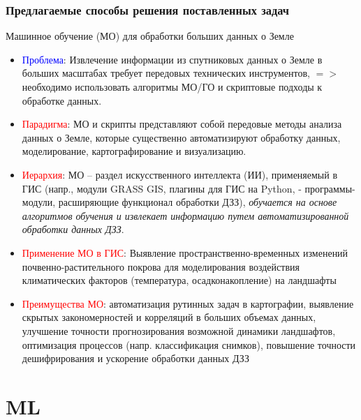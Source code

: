 \documentclass[pdflatex,compress,8pt,
	xcolor={dvipsnames,dvipsnames,svgnames,x11names,table},
	hyperref={colorlinks = true, breaklinks = true, urlcolor = NavyBlue, linkcolor=white, breaklinks = true}]{beamer}
\begin{document}
\begin{frame}\frametitle{Предлагаемые способы решения поставленных задач}
 \begin{exampleblock}{Машинное обучение (МО) для обработки больших данных о Земле}
\begin{itemize}
	\item \textcolor{blue}{Проблема}: Извлечение информации из спутниковых данных о Земле в больших масштабах требует передовых технических инструментов, $=>$ необходимо использовать алгоритмы МО/ГО и скриптовые подходы к обработке данных. 
	\item \textcolor{red}{Парадигма}: МО и скрипты представляют собой передовые методы анализа данных о Земле, которые существенно автоматизируют обработку данных, моделирование, картографирование и визуализацию.
	\item \textcolor{red}{Иерархия}: МО -- раздел искусственного интеллекта (ИИ), применяемый в ГИС (напр., модули GRASS GIS, плагины для ГИС на Python, - программы-модули, расширяющие функционал обработки ДЗЗ), \emph{обучается на основе алгоритмов обучения и извлекает информацию путем автоматизированной обработки данных ДЗЗ}. 
	\item \textcolor{red}{Применение МО в ГИС}: Выявление пространственно-временных изменений почвенно-растительного покрова для моделирования воздействия климатических факторов (температура, осадконакопление) на ландшафты
	\item \textcolor{red}{Преимущества МО}: автоматизация рутинных задач в картографии, выявление скрытых закономерностей и корреляций в больших объемах данных, улучшение точности прогнозирования возможной динамики ландшафтов, оптимизация процессов (напр. классификация снимков), повышение точности дешифрирования и ускорение обработки данных ДЗЗ
\end{itemize}
\end{exampleblock} 
\end{frame}

\section{ML}
\end{document}
